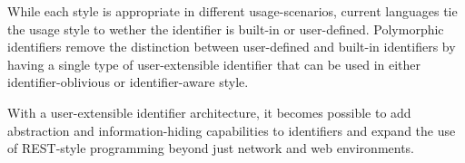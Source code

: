 \documentclass[preprint,authoryear]{acm_proc_article-sp}
\begin{document}
While each style is appropriate in different usage-scenarios, current languages 
tie the usage style to wether the identifier is built-in or user-defined.  Polymorphic
identifiers remove the distinction between user-defined and built-in identifiers by having
a single type of user-extensible identifier that can be used in either identifier-oblivious
or identifier-aware style.

With a user-extensible identifier architecture, it becomes possible to add abstraction
and information-hiding capabilities to identifiers and expand the use of REST-style
programming beyond just network and web environments.












\balancecolumns
\end{document}
